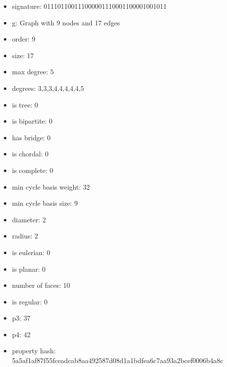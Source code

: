 \newpage
\begin{figure}
\end{figure}
\begin{itemize}
\item signature: 011101100111000001110001100001001011
\item g: Graph with 9 nodes and 17 edges
\item order: 9
\item size: 17
\item max degree: 5
\item degrees: 3,3,3,4,4,4,4,4,5
\item is tree: 0
\item is bipartite: 0
\item has bridge: 0
\item is chordal: 0
\item is complete: 0
\item min cycle basis weight: 32
\item min cycle basis size: 9
\item diameter: 2
\item radius: 2
\item is eulerian: 0
\item is planar: 0
\item number of faces: 10
\item is regular: 0
\item p3: 37
\item p4: 42
\item property hash: 5a5af1af87f55fceadcab8aa492587d08d1a1bdfea6c7aa93a2bcef0006b4a8c
\end{itemize}
